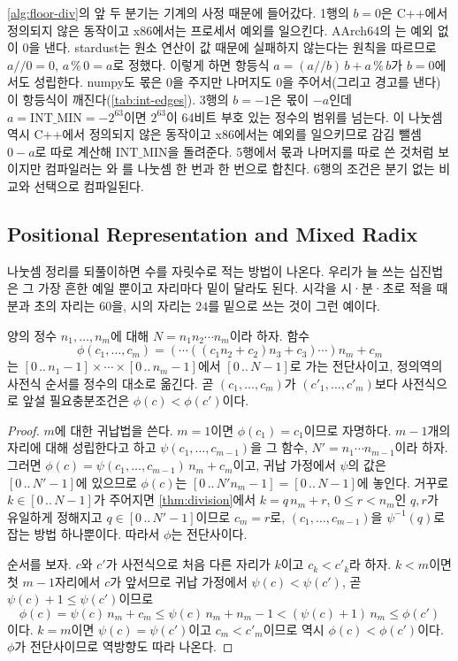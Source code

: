 \cref{alg:floor-div}의 앞 두 분기는 기계의 사정 때문에 들어갔다. 1행의 $b=0$은 C++에서 정의되지 않은 동작이고 x86에서는 프로세서 예외를 일으킨다. AArch64의 는 예외 없이 $0$을 낸다. stardust는 원소 연산이 값 때문에 실패하지 않는다는 원칙을 따르므로 $a\mathbin{/\!/}0=0$, $a\mathbin{\%}0=a$로 정했다. 이렇게 하면 항등식 $a=(a\mathbin{/\!/}b)\,b+a\mathbin{\%}b$가 $b=0$에서도 성립한다. numpy도 몫은 $0$을 주지만 나머지도 $0$을 주어서(그리고 경고를 낸다) 이 항등식이 깨진다(\cref{tab:int-edges}). 3행의 $b=-1$은 몫이 $-a$인데 $a=\mathrm{INT\_MIN}=-2^{63}$이면 $2^{63}$이 64비트 부호 있는 정수의 범위를 넘는다. 이 나눗셈 역시 C++에서 정의되지 않은 동작이고 x86에서는 예외를 일으키므로 감김 뺄셈 $0-a$로 따로 계산해 $\mathrm{INT\_MIN}$을 돌려준다. 5행에서 몫과 나머지를 따로 쓴 것처럼 보이지만 컴파일러는 와 를 나눗셈 한 번과  한 번으로 합친다. 6행의 조건은 분기 없는 비교와 선택으로 컴파일된다.

\subsection{Positional Representation and Mixed Radix}

나눗셈 정리를 되풀이하면 수를 자릿수로 적는 방법이 나온다. 우리가 늘 쓰는 십진법은 그 가장 흔한 예일 뿐이고 자리마다 밑이 달라도 된다. 시각을 시·분·초로 적을 때 분과 초의 자리는 $60$을, 시의 자리는 $24$를 밑으로 쓰는 것이 그런 예이다.

\begin{theorem}[혼합 기수 표현]
\label{thm:mixed-radix}
양의 정수 $n_1,\dots,n_m$에 대해 $N=n_1n_2\cdots n_m$이라 하자. 함수
\[
\phi(c_1,\dots,c_m)=(\cdots((c_1n_2+c_2)n_3+c_3)\cdots)n_m+c_m
\]
는 $[0\,..\,n_1-1]\times\cdots\times[0\,..\,n_m-1]$에서 $[0\,..\,N-1]$로 가는 전단사이고, 정의역의 사전식 순서를 정수의 대소로 옮긴다. 곧 $(c_1,\dots,c_m)$가 $(c'_1,\dots,c'_m)$보다 사전식으로 앞설 필요충분조건은 $\phi(c)<\phi(c')$이다.
\end{theorem}

\begin{proof}
$m$에 대한 귀납법을 쓴다. $m=1$이면 $\phi(c_1)=c_1$이므로 자명하다. $m-1$개의 자리에 대해 성립한다고 하고 $\psi(c_1,\dots,c_{m-1})$을 그 함수, $N'=n_1\cdots n_{m-1}$이라 하자. 그러면 $\phi(c)=\psi(c_1,\dots,c_{m-1})\,n_m+c_m$이고, 귀납 가정에서 $\psi$의 값은 $[0\,..\,N'-1]$에 있으므로 $\phi(c)$는 $[0\,..\,N'n_m-1]=[0\,..\,N-1]$에 놓인다. 거꾸로 $k\in[0\,..\,N-1]$가 주어지면 \cref{thm:division}에서 $k=q\,n_m+r$, $0\le r<n_m$인 $q,r$가 유일하게 정해지고 $q\in[0\,..\,N'-1]$이므로 $c_m=r$로, $(c_1,\dots,c_{m-1})$을 $\psi^{-1}(q)$로 잡는 방법 하나뿐이다. 따라서 $\phi$는 전단사이다.

순서를 보자. $c$와 $c'$가 사전식으로 처음 다른 자리가 $k$이고 $c_k<c'_k$라 하자. $k<m$이면 첫 $m-1$자리에서 $c$가 앞서므로 귀납 가정에서 $\psi(c)<\psi(c')$, 곧 $\psi(c)+1\le\psi(c')$이므로
\[
\phi(c)=\psi(c)\,n_m+c_m\le\psi(c)\,n_m+n_m-1<(\psi(c)+1)\,n_m\le\phi(c')
\]
이다. $k=m$이면 $\psi(c)=\psi(c')$이고 $c_m<c'_m$이므로 역시 $\phi(c)<\phi(c')$이다. $\phi$가 전단사이므로 역방향도 따라 나온다.
\end{proof}

